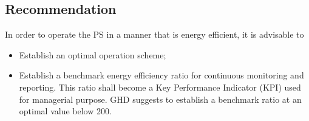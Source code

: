 \subsection{Recommendation}
In order to operate the PS in a manner that is energy efficient, it is advisable to 

\begin{itemize}
\item Establish an optimal operation scheme;
\item Establish a benchmark energy efficiency ratio for continuous monitoring and reporting. This ratio shall become a Key Performance Indicator (KPI) used for managerial purpose. GHD suggests to establish a benchmark ratio at an optimal value below 200.
\end{itemize}
